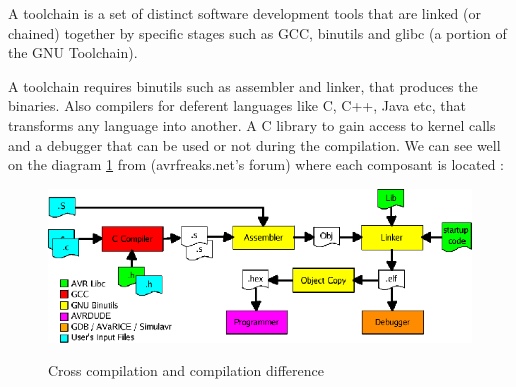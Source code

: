	\par A toolchain is a set of distinct software development tools that are linked (or chained) together by specific stages such as GCC, binutils and glibc (a portion of the GNU Toolchain)\cite{Toolchain}.
	\par A toolchain requires binutils such as assembler and linker, that produces the binaries. Also compilers for deferent languages like C, C++, Java etc, that transforms any language into another. A C library to gain access to kernel calls and a debugger that can be used or not during the compilation. We can see well on the diagram \ref{compchain} from (avrfreaks.net's forum)  where each composant is located :
	\begin{figure}[ht]
		\begin{center}
			\includegraphics[scale=0.5]{images_not_compressed/compchain.png}
			\label{compchain}
			\caption{Cross compilation and compilation difference}
		\end{center}
	\end{figure}

	